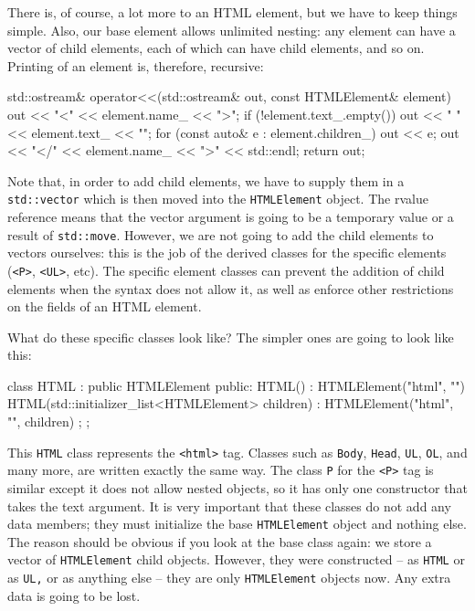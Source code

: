 There is, of course, a lot more to an HTML element, but we have to keep things simple. Also, our base element allows unlimited nesting: any element can have a vector of child elements, each of which can have child elements, and so on. Printing of an element is, therefore, recursive:

\begin{code}
std::ostream& operator<<(std::ostream& out,
                         const HTMLElement& element) {
  out << "<" << element.name_ << ">\n";
  if (!element.text_.empty())
    out << "  " << element.text_ << "\n";
  for (const auto& e : element.children_) out << e;
  out << "</" << element.name_ << ">" << std::endl;
  return out;
}
\end{code}

Note that, in order to add child elements, we have to supply them in a \texttt{std::vector} which is then moved into the \texttt{HTMLElement} object. The rvalue reference means that the vector argument is going to be a temporary value or a result of \texttt{std::move}. However, we are not going to add the child elements to vectors ourselves: this is the job of the derived classes for the specific elements (\texttt{\textless{}P\textgreater{}}, \texttt{\textless{}UL\textgreater{}}, etc). The specific element classes can prevent the addition of child elements when the syntax does not allow it, as well as enforce other restrictions on the fields of an HTML element.

What do these specific classes look like? The simpler ones are going to look like this:

\begin{code}
class HTML : public HTMLElement {
  public:
  HTML() : HTMLElement("html", "") {}
  HTML(std::initializer_list<HTMLElement> children) :
    HTMLElement("html", "", children) {};
};
\end{code}

This \texttt{HTML} class represents the \texttt{\textless{}html\textgreater{}} tag. Classes such as \texttt{Body}, \texttt{Head}, \texttt{UL}, \texttt{OL}, and many more, are written exactly the same way. The class \texttt{P} for the \texttt{\textless{}P\textgreater{}} tag is similar except it does not allow nested objects, so it has only one constructor that takes the text argument. It is very important that these classes do not add any data members; they must initialize the base \texttt{HTMLElement} object and nothing else. The reason should be obvious if you look at the base class again: we store a vector of \texttt{HTMLElement} child objects. However, they were constructed -- as \texttt{HTML} or as \texttt{UL,} or as anything else -- they are only \texttt{HTMLElement} objects now. Any extra data is going to be lost.

